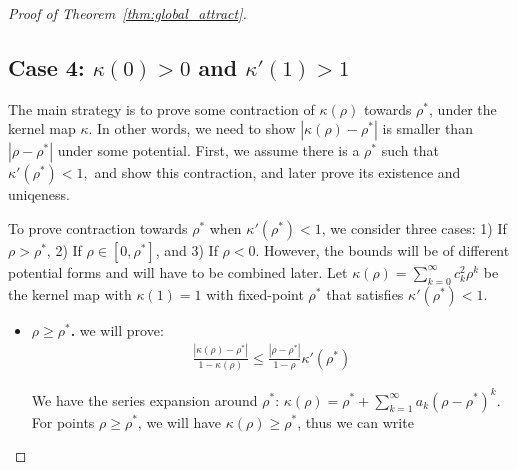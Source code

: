\documentclass[twoside]{article}
\theoremstyle{definition}
\begin{document}
\begin{proof}[Proof of Theorem~\ref{thm:global_attract}]
\subsection*{Case 4: $\kappa(0)>0$ and $\kappa'(1)>1$}
The main strategy is to prove some contraction of $\kappa(\rho)$ towards $\rho^*$, under the kernel map $\kappa$. In other words, we need to show $|\kappa(\rho)-\rho^*|$ is smaller than $|\rho-\rho^*|$ under some potential. First, we assume there is a $\rho^*$ such that $\kappa'(\rho^*)<1,$ and show this contraction, and later prove its existence and uniqeness. 

To prove contraction towards $\rho^*$ when $\kappa'(\rho^*)<1$, we consider three cases: 1) If $\rho > \rho^*$, 2) If $\rho \in [0,\rho^*]$, and 3) If $\rho < 0$. However, the bounds will be of different potential forms and will have to be combined later.  Let $\kappa(\rho) = \sum_{k=0}^\infty c_k^2 \rho^k$ be the kernel map with $\kappa(1)= 1$ with fixed-point $\rho^*$ that satisfies $\kappa'(\rho^*)<1.$

\begin{itemize}
\item \textbf{$\rho\ge \rho^*$.} we will prove:
\begin{align*}
\frac{|\kappa(\rho)-\rho^*|}{1-\kappa(\rho)} \le \frac{|\rho-\rho^*|}{1-\rho} \kappa'(\rho^*)
\end{align*}

We have the series expansion around $\rho^*$: $\kappa(\rho) = \rho^* + \sum_{k=1}^\infty a_k (\rho-\rho^*)^k$. For points $\rho\ge \rho^*$, we will have $\kappa(\rho)\ge \rho^*$, thus we can write


\end{itemize}
\end{proof}
\end{document}
